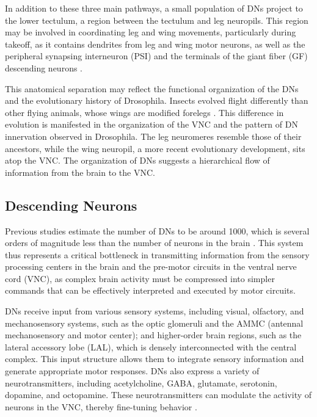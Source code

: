 \documentclass[../main/thesis_msc.tex]{subfiles}
\begin{document}
	In addition to these three main pathways, a small population of DNs project to the lower tectulum, a region between the tectulum and leg neuropils. This region may be involved in coordinating leg and wing movements, particularly during takeoff, as it contains dendrites from leg and wing motor neurons, as well as the peripheral synapsing interneuron (PSI) and the terminals of the giant fiber (GF) descending neurons \autocite{card_escape_2012,von_reyn_spike-timing_2014}.

	This anatomical separation may reflect the functional organization of the DNs and the evolutionary history of Drosophila. Insects evolved flight differently than other flying animals, whose wings are modified forelegs \autocite{gatesy_locomotor_1996}. This difference in evolution is manifested in the organization of the VNC and the pattern of DN innervation observed in Drosophila. The leg neuromeres resemble those of their ancestors, while the wing neuropil, a more recent evolutionary development, sits atop the VNC. The organization of DNs suggests a hierarchical flow of information from the brain to the VNC. 

	\subsection{Descending Neurons}

	Previous studies estimate the number of DNs to be around 1000, which is several orders of magnitude less than the number of neurons in the brain \autocite{hsu_organization_2016, namiki_functional_2018}. This system thus represents a critical bottleneck in transmitting information from the sensory processing centers in the brain and the pre-motor circuits in the ventral nerve cord (VNC), as complex brain activity must be compressed into simpler commands that can be effectively interpreted and executed by motor circuits.

	DNs receive input from various sensory systems, including visual, olfactory, and mechanosensory systems, such as the optic glomeruli and the AMMC (antennal mechanosensory and motor center); and higher-order brain regions, such as the lateral accessory lobe (LAL), which is densely interconnected with the central complex. This input structure allows them to integrate sensory information and generate appropriate motor responses. DNs also express a variety of neurotransmitters, including acetylcholine, GABA, glutamate, serotonin, dopamine, and octopamine. These neurotransmitters can modulate the activity of neurons in the VNC, thereby fine-tuning behavior \autocite{hsu_organization_2016, namiki_functional_2018}.
\end{document}
